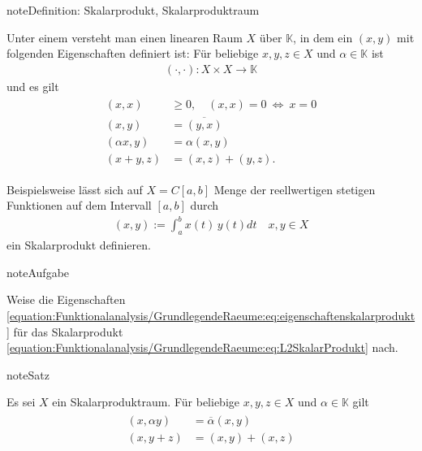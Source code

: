 \documentclass[letterpaper,10pt,english]{jupyterBook}
\begin{document}
\begin{sphinxadmonition}{note}{Definition: Skalarprodukt, Skalarproduktraum}

Unter einem  versteht man einen linearen Raum \(X\) über \(\mathbb{K}\), in dem ein  \((x,y)\) mit folgenden Eigenschaften definiert ist: Für beliebige \(x,y,z \in X\) und \(\alpha\in\mathbb{K}\) ist
\begin{equation*}
\begin{split}(\cdot, \cdot) : X \times X \to \mathbb{K}\end{split}
\end{equation*}
und es gilt
\begin{equation}\label{equation:Funktionalanalysis/GrundlegendeRaeume:eq:eigenschaftenskalarprodukt}
\begin{split}\begin{split}
(x,x) & \ge 0, \quad (x,x) = 0\ \Leftrightarrow\ x=0\\
(x,y) & = \overline{(y,x)}\\
(\alpha x, y) & = \alpha (x,y)\\
(x+y,z) & = (x,z) + (y,z).
\end{split}\end{split}
\end{equation}\end{sphinxadmonition}

Beispielsweise lässt sich auf \(X=C[a,b]\) Menge der reellwertigen stetigen Funktionen auf dem Intervall \([a,b]\) durch
\begin{equation}\label{equation:Funktionalanalysis/GrundlegendeRaeume:eq:L2SkalarProdukt}
\begin{split}(x,y) := \int_a^b x(t)\,y(t) dt\quad x,y \in X\end{split}
\end{equation}
ein Skalarprodukt definieren.

\begin{sphinxadmonition}{note}{Aufgabe}

Weise die Eigenschaften \eqref{equation:Funktionalanalysis/GrundlegendeRaeume:eq:eigenschaftenskalarprodukt} für das Skalarprodukt \eqref{equation:Funktionalanalysis/GrundlegendeRaeume:eq:L2SkalarProdukt} nach.
\end{sphinxadmonition}

\begin{sphinxadmonition}{note}{Satz}

Es sei \(X\) ein Skalarproduktraum. Für beliebige \(x,y,z\in X\) und \(\alpha \in \mathbb{K}\) gilt
\begin{equation*}
\begin{split}\begin{split}(x, \alpha y) & = \overline{\alpha} (x,y)\\
(x, y+z) & = (x,y) + (x,z)\end{split}\end{split}
\end{equation*}\end{sphinxadmonition}
\end{document}
